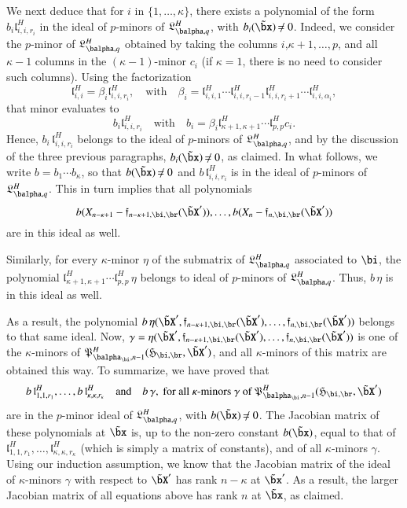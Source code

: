 \documentclass[amsthm]{elsart}
\begin{document}
We next deduce that for $i$ in $\{1,\dots,\kappa\}$, there exists a
polynomial of the form $b_{i} \mathfrak{l}^H_{i,i,r_i}$ in the ideal
of $p$-minors of $\mathfrak{L}^H_{\balpha,q}$, with
$b_{i}(\tilde\bx)\ne 0$. Indeed, we consider the $p$-minor of
$\mathfrak{L}^H_{\balpha,q}$ obtained by taking the columns
$i$,$\kappa+1,\dots,p$, and all $\kappa-1$ columns in the
$(\kappa-1)$-minor $c_i$ (if $\kappa=1$, there is no need to consider
such columns). Using the factorization
$$\mathfrak{l}^H_{i,i} = \beta_i \mathfrak{l}^H_{i,i,r_i},\quad\text{with}\quad
\beta_i=\mathfrak{l}^H_{i,i,1}\cdots \mathfrak{l}^H_{i,i,r_i-1}\mathfrak{l}^H_{i,i,r_i+1}\cdots \mathfrak{l}^H_{i,i,\alpha_i},$$
that minor evaluates to 
$$b_i \mathfrak{l}^H_{i,i,r_i}\quad\text{with}\quad b_i = \beta_i
\mathfrak{l}^H_{\kappa+1,\kappa+1}\cdots \mathfrak{l}^H_{p,p}c_i.$$
Hence, $b_i\, \mathfrak{l}^H_{i,i,r_i}$ belongs to the ideal of
$p$-minors of $\mathfrak{L}^H_{\balpha,q}$, and by the discussion of
the three previous paragraphs, $b_i(\tilde\bx)\ne 0$, as claimed. In
what follows, we write $b=b_1 \cdots b_\kappa$, so that $b(\tilde\bx)
\ne 0$ and $b\, \mathfrak{l}^H_{i,i,r_i}$ is in
the ideal of $p$-minors of 
$\mathfrak{L}^H_{\balpha,q}$.  This in turn implies that all
polynomials
$$
b(X_{n-\kappa+1}-\mathfrak{f}_{n-\kappa+1,\bi,\br}(\tilde\bX')),\dots,b(X_{n}-\mathfrak{f}_{n,\bi,\br}(\tilde\bX'))
$$ are in this ideal as well.

Similarly, for every $\kappa$-minor $\eta$ of the submatrix of
$\mathfrak{L}^H_{\balpha,q}$ associated to $\bi$, the polynomial
$\mathfrak{l}^H_{\kappa+1,\kappa+1}\cdots \mathfrak{l}^H_{p,p}\, \eta$
belongs to ideal of $p$-minors of $\mathfrak{L}^H_{\balpha,q}$. Thus,
$b \,\eta$ is in this ideal as well.

As a result, the polynomial $b\,
\eta(\tilde\bX',\mathfrak{f}_{n-\kappa+1,\bi,\br}(\tilde\bX'),\dots,\mathfrak{f}_{n,\bi,\br}(\tilde\bX'))$
belongs to that same ideal. Now,
$\gamma=\eta(\tilde\bX',\mathfrak{f}_{n-\kappa+1,\bi,\br}(\tilde\bX'),\dots,\mathfrak{f}_{n,\bi,\br}(\tilde\bX'))$
is one of the $\kappa$-minors of
$\mathfrak{P}^H_{\balpha_\bi,n-1}(\mathfrak{H}_{\bi,\br},\tilde\bX')$,
and all $\kappa$-minors of this matrix are obtained this way.  To
summarize, we have proved that
$$b\, \mathfrak{l}^H_{1,1,r_1},\dots,b\,
\mathfrak{l}^H_{\kappa,\kappa,r_\kappa} \quad\text{and}\quad b\,
\gamma, \text{~for all $\kappa$-minors $\gamma$ of
  $\mathfrak{P}^H_{\balpha_\bi,n-1}(\mathfrak{H}_{\bi,\br},\tilde\bX')$}$$
are in the $p$-minor ideal of 
 $\mathfrak{L}^H_{\balpha,q}$, with $b(\tilde\bx) \ne
0$. The Jacobian matrix of these polynomials at $\tilde\bx$ is, up to
the non-zero constant $b(\tilde\bx)$, equal to that of
$\mathfrak{l}^H_{1,1,r_1},\dots,
\mathfrak{l}^H_{\kappa,\kappa,r_\kappa}$ (which is simply a matrix of
constants), and of all $\kappa$-minors $\gamma$. Using our induction
assumption, we know that the Jacobian matrix of the ideal of
$\kappa$-minors $\gamma$ with respect to $\tilde\bX'$ has rank
$n-\kappa$ at $\tilde\bx'$. As a result, the larger Jacobian matrix of
all equations above has rank $n$ at $\tilde\bx$, as claimed.
\end{document}
